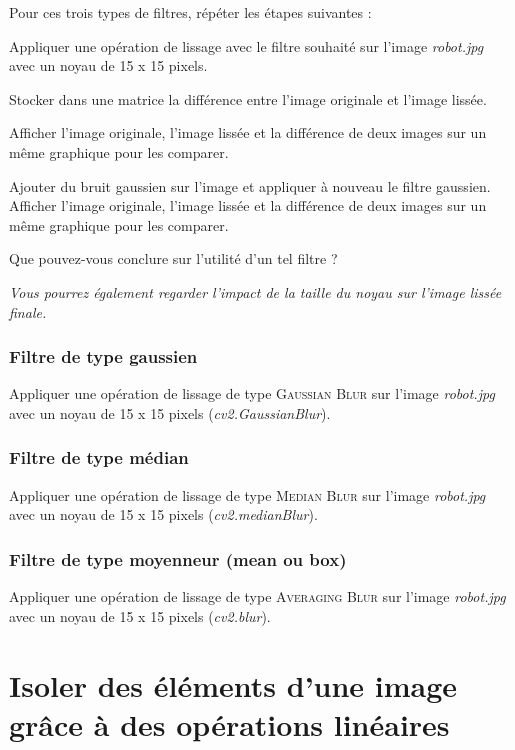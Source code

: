 \documentclass[a4paper,11pt,titlepage]{article} %
\begin{document}
Pour ces trois types de filtres, répéter les étapes suivantes :

\Manip Appliquer une opération de lissage avec le filtre souhaité sur l'image \textsl{robot.jpg} avec un noyau de 15 x 15 pixels.

\Manip Stocker dans une matrice la différence entre l'image originale et l'image lissée.

\Manip Afficher l'image originale, l'image lissée et la différence de deux images sur un même graphique pour les comparer.

\Manip Ajouter du bruit gaussien sur l'image et appliquer à nouveau le filtre gaussien. Afficher l'image originale, l'image lissée et la différence de deux images sur un même graphique pour les comparer.

\Quest Que pouvez-vous conclure sur l'utilité d'un tel filtre ?

\textit{Vous pourrez également regarder l'impact de la taille du noyau sur l'image lissée finale.}


\subsubsection{Filtre de type gaussien}

\Manip Appliquer une opération de lissage de type \textsc{Gaussian Blur} sur l'image \textsl{robot.jpg} avec un noyau de 15 x 15 pixels (\textsl{cv2.GaussianBlur}).

\subsubsection{Filtre de type médian}

\Manip Appliquer une opération de lissage de type \textsc{Median Blur} sur l'image \textsl{robot.jpg} avec un noyau de 15 x 15 pixels (\textsl{cv2.medianBlur}).

\subsubsection{Filtre de type moyenneur (mean ou box)}

\Manip Appliquer une opération de lissage de type \textsc{Averaging Blur} sur l'image \textsl{robot.jpg} avec un noyau de 15 x 15 pixels (\textsl{cv2.blur}).


\newpage	
\section{Isoler des éléments d'une image grâce à des opérations linéaires}
\end{document}
